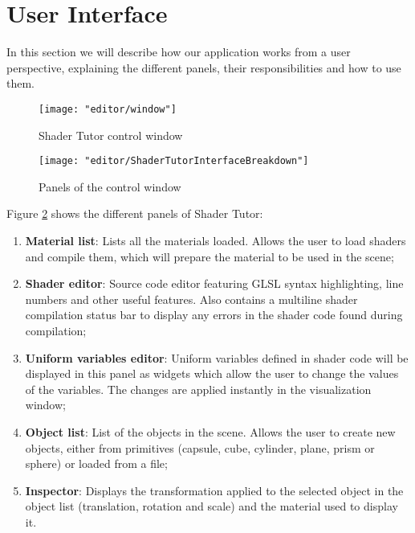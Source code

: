 \section{User Interface}
In this section we will describe how our application works from a user perspective, explaining the different panels, their responsibilities and how to use them.

\begin{figure}[ht]
    \caption{Shader Tutor control window}
    \begin{center}
        \texttt{[image: "editor/window"]}
    \end{center}
    \label{fig:window}
\end{figure}

\begin{figure}[ht]
    \caption{Panels of the control window}
    \begin{center}
        \texttt{[image: "editor/ShaderTutorInterfaceBreakdown"]}
    \end{center}
    \label{fig:interface_breakdown}
\end{figure}

Figure \ref{fig:interface_breakdown} shows the different panels of Shader Tutor:
\begin{enumerate}
    \item \textbf{Material list}: Lists all the materials loaded. Allows the user to load shaders and compile them, which will prepare the material to be used in the scene;
    \item \textbf{Shader editor}: Source code editor featuring GLSL syntax highlighting, line numbers and other useful features. Also contains a multiline shader compilation status bar to display any errors in the shader code found during compilation;
    \item \textbf{Uniform variables editor}: Uniform variables defined in shader code will be displayed in this panel as widgets which allow the user to change the values of the variables. The changes are applied instantly in the visualization window;
    \item \textbf{Object list}: List of the objects in the scene. Allows the user to create new objects, either from primitives (capsule, cube, cylinder, plane, prism or sphere) or loaded from a file;
    \item \textbf{Inspector}: Displays the transformation applied to the selected object in the object list (translation, rotation and scale) and the material used to display it.
\end{enumerate}

